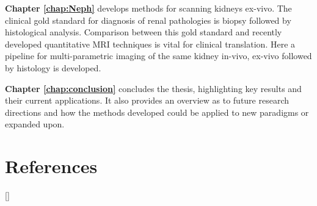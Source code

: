 \textbf{Chapter \ref{chap:Neph}} develops methods for scanning kidneys ex-vivo. The clinical gold standard for diagnosis of renal pathologies is biopsy followed by histological analysis. Comparison between this gold standard and recently developed quantitative \ac{MRI} techniques is vital for clinical translation. Here a pipeline for multi-parametric imaging of the same kidney in-vivo, ex-vivo followed by histology is developed.

\textbf{Chapter \ref{chap:conclusion}} concludes the thesis, highlighting key results and their current applications. It also provides an overview as to future research directions and how the methods developed could be applied to new paradigms or expanded upon.

\newpage
\section{References}
[\refname]{}
\printbibliography